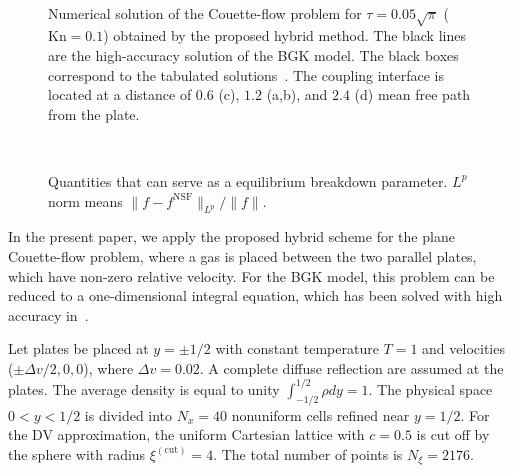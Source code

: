 \documentclass{aip-cp}
\makeatletter
\newenvironment{subfigures}
 {\begin{minipage}{\columnwidth}\def\@captype{figure}\centering}
 {\end{minipage}}
\newcommand{\Kn}{\mathrm{Kn}}
\makeatother
\begin{document}
\begin{figure}
    \begin{subfigures}
    \centering
    \\
    \end{subfigures}
    \caption{
        Numerical solution of the Couette-flow problem for $\tau=0.05\sqrt\pi$ ($\Kn=0.1$) obtained by the proposed hybrid method.
        The black lines are the high-accuracy solution of the BGK model.
        The black boxes correspond to the tabulated solutions~\cite{Luo2015, Luo2016}.
        The coupling interface is located at a distance of $0.6$ (c),
        $1.2$ (a,b), and $2.4$ (d) mean free path from the plate.
    }\label{fig:hybrid}
\end{figure}

\begin{figure}
    \begin{subfigures}
    \centering
    \\
    \end{subfigures}
    \caption{
        Quantities that can serve as a equilibrium breakdown parameter. \(L^p\) norm means \(\|f-f^{\mathrm{NSF}}\|_{L^p}/\|f\|\).
    }\label{fig:norms}
\end{figure}

In the present paper, we apply the proposed hybrid scheme for the plane Couette-flow problem,
where a gas is placed between the two parallel plates, which have non-zero relative velocity.
For the BGK model, this problem can be reduced to a one-dimensional integral equation,
which has been solved with high accuracy in~\cite{Luo2015, Luo2016}.

Let plates be placed at $y = \pm 1/2$ with constant temperature $T = 1$ and velocities ($\pm\Delta v/2,0,0$), where $\Delta v=0.02$.
A complete diffuse reflection are assumed at the plates.
The average density is equal to unity $\int_{-1/2}^{1/2}\rho dy=1$.
The physical space $0 < y < 1/2$ is divided into $N_x = 40$ nonuniform cells refined near $y = 1/2$.
For the DV approximation, the uniform Cartesian lattice with $c=0.5$ is cut off by the sphere with radius $\xi^{(\mathrm{cut})}=4$.
The total number of points is $N_\xi=2176$.
\end{document}
